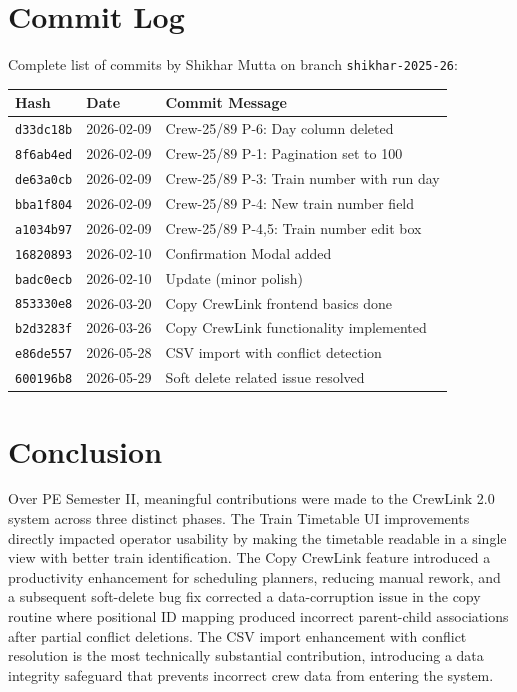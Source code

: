 \documentclass[12pt,a4paper]{article}
\begin{document}
\section{Commit Log}

Complete list of commits by Shikhar Mutta on branch \texttt{shikhar-2025-26}:

\begin{center}
\begin{tabular}{@{} L{2.4cm} L{2.4cm} L{8.5cm} @{}}
\toprule
\textbf{Hash} & \textbf{Date} & \textbf{Commit Message} \\
\midrule
\texttt{d33dc18b} & 2026-02-09 & Crew-25/89 P-6: Day column deleted \\
\texttt{8f6ab4ed} & 2026-02-09 & Crew-25/89 P-1: Pagination set to 100 \\
\texttt{de63a0cb} & 2026-02-09 & Crew-25/89 P-3: Train number with run day \\
\texttt{bba1f804} & 2026-02-09 & Crew-25/89 P-4: New train number field \\
\texttt{a1034b97} & 2026-02-09 & Crew-25/89 P-4,5: Train number edit box \\
\texttt{16820893} & 2026-02-10 & Confirmation Modal added \\
\texttt{badc0ecb} & 2026-02-10 & Update (minor polish) \\
\texttt{853330e8} & 2026-03-20 & Copy CrewLink frontend basics done \\
\texttt{b2d3283f} & 2026-03-26 & Copy CrewLink functionality implemented \\
\texttt{e86de557} & 2026-05-28 & CSV import with conflict detection \\
\texttt{600196b8} & 2026-05-29 & Soft delete related issue resolved \\
\bottomrule
\end{tabular}
\end{center}

\section{Conclusion}

Over PE Semester II, meaningful contributions were made to the CrewLink 2.0
system across three distinct phases. The Train Timetable UI improvements
directly impacted operator usability by making the timetable readable in a
single view with better train identification. The Copy CrewLink feature
introduced a productivity enhancement for scheduling planners, reducing manual
rework, and a subsequent soft-delete bug fix corrected a data-corruption issue
in the copy routine where positional ID mapping produced incorrect parent-child
associations after partial conflict deletions. The CSV import enhancement with
conflict resolution is the most technically substantial contribution,
introducing a data integrity safeguard that prevents incorrect crew data from
entering the system.
\end{document}
